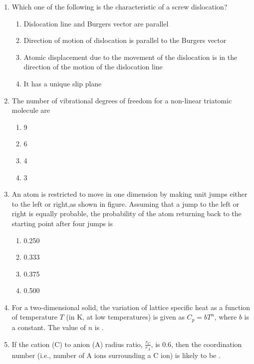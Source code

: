 \documentclass[journal,12pt,onecolumn]{IEEEtran}
\theoremstyle{remark}
\begin{document}
\begin{enumerate}
    \item Which one of the following is the characteristic of a screw dislocation?
    
    \begin{enumerate}
        \item Dislocation line and Burgers vector are parallel
        \item Direction of motion of dislocation is parallel to the Burgers vector
        \item Atomic displacement due to the movement of the dislocation is in the direction of the motion of the dislocation line
        \item It has a unique slip plane
    \end{enumerate}

    \item The number of vibrational degrees of freedom for a non-linear triatomic molecule are
        \begin{multicols}{4}

    \begin{enumerate}
        \item 9
        \item 6
        \item 4
        \item 3
    \end{enumerate}
    \end{multicols}

    \item An atom is restricted to move in one dimension by making unit jumps either to the left or right,as shown in figure. Assuming that a jump to the left or right is equally probable, the probability of the atom returning back to the starting point after four jumps is
    \begin{figure}[H]
        \centering
    \end{figure}
    \begin{multicols}{4}
    \begin{enumerate}
        \item 0.250
        \item 0.333
        \item 0.375
        \item 0.500
    \end{enumerate}
    \end{multicols}
    
    \item For a two-dimensional solid, the variation of lattice specific heat as a function of temperature $T$ (in K, at low temperatures) is given as $C_p = bT^n$, where $b$ is a constant. The value of $n$ is {\underline{\hspace{2cm}}}.

    \item If the cation (C) to anion (A) radius ratio, $\frac{r_C}{r_A}$, is 0.6, then the coordination number (i.e., number of A ions surrounding a C ion) is likely to be {\underline{\hspace{2cm}}}.

   

\end{enumerate}
\end{document}
